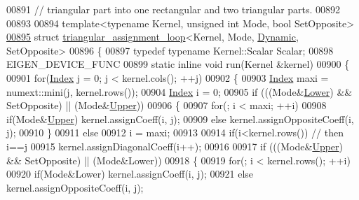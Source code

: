 \begin{DoxyCode}
00891 \textcolor{comment}{//       triangular part into one rectangular and two triangular parts.}
00892 
00893 
00894 \textcolor{keyword}{template}<\textcolor{keyword}{typename} Kernel, \textcolor{keywordtype}{unsigned} \textcolor{keywordtype}{int} Mode, \textcolor{keywordtype}{bool} SetOpposite>
\hyperlink{struct_eigen_1_1internal_1_1triangular__assignment__loop_3_01_kernel_00_01_mode_00_01_dynamic_00_01_set_opposite_01_4}{00895} \textcolor{keyword}{struct }\hyperlink{struct_eigen_1_1internal_1_1triangular__assignment__loop}{triangular\_assignment\_loop}<Kernel, Mode, 
      \hyperlink{namespace_eigen_ad81fa7195215a0ce30017dfac309f0b2}{Dynamic}, SetOpposite>
00896 \{
00897   \textcolor{keyword}{typedef} \textcolor{keyword}{typename} Kernel::Scalar Scalar;
00898   EIGEN\_DEVICE\_FUNC
00899   \textcolor{keyword}{static} \textcolor{keyword}{inline} \textcolor{keywordtype}{void} run(Kernel &kernel)
00900   \{
00901     \textcolor{keywordflow}{for}(\hyperlink{namespace_eigen_a62e77e0933482dafde8fe197d9a2cfde}{Index} j = 0; j < kernel.cols(); ++j)
00902     \{
00903       \hyperlink{namespace_eigen_a62e77e0933482dafde8fe197d9a2cfde}{Index} maxi = numext::mini(j, kernel.rows());
00904       \hyperlink{namespace_eigen_a62e77e0933482dafde8fe197d9a2cfde}{Index} i = 0;
00905       \textcolor{keywordflow}{if} (((Mode&\hyperlink{group__enums_gga39e3366ff5554d731e7dc8bb642f83cda891792b8ed394f7607ab16dd716f60e6}{Lower}) && SetOpposite) || (Mode&\hyperlink{group__enums_gga39e3366ff5554d731e7dc8bb642f83cda6bcb58be3b8b8ec84859ce0c5ac0aaec}{Upper}))
00906       \{
00907         \textcolor{keywordflow}{for}(; i < maxi; ++i)
00908           \textcolor{keywordflow}{if}(Mode&\hyperlink{group__enums_gga39e3366ff5554d731e7dc8bb642f83cda6bcb58be3b8b8ec84859ce0c5ac0aaec}{Upper}) kernel.assignCoeff(i, j);
00909           \textcolor{keywordflow}{else}           kernel.assignOppositeCoeff(i, j);
00910       \}
00911       \textcolor{keywordflow}{else}
00912         i = maxi;
00913       
00914       \textcolor{keywordflow}{if}(i<kernel.rows()) \textcolor{comment}{// then i==j}
00915         kernel.assignDiagonalCoeff(i++);
00916       
00917       \textcolor{keywordflow}{if} (((Mode&\hyperlink{group__enums_gga39e3366ff5554d731e7dc8bb642f83cda6bcb58be3b8b8ec84859ce0c5ac0aaec}{Upper}) && SetOpposite) || (Mode&Lower))
00918       \{
00919         \textcolor{keywordflow}{for}(; i < kernel.rows(); ++i)
00920           \textcolor{keywordflow}{if}(Mode&Lower) kernel.assignCoeff(i, j);
00921           \textcolor{keywordflow}{else}           kernel.assignOppositeCoeff(i, j);

\end{DoxyCode}
